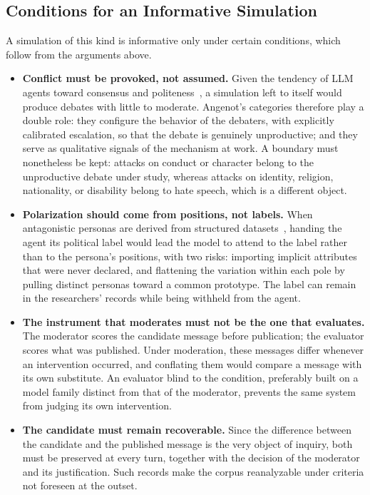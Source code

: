 \documentclass[conference]{IEEEtran}
\begin{document}
\subsection{Conditions for an Informative Simulation}\label{sec:conditions}

A simulation of this kind is informative only under certain conditions, which
follow from the arguments above.

\begin{itemize}
\item \textbf{Conflict must be provoked, not assumed.} Given the tendency of
LLM agents toward consensus and politeness~\cite{chuang2023simulating}, a
simulation left to itself would produce debates with little to moderate.
Angenot's categories therefore play a double role: they configure the
behavior of the debaters, with explicitly calibrated escalation, so that the
debate is genuinely unproductive; and they serve as qualitative signals of the
mechanism at work. A boundary must nonetheless be kept: attacks on conduct or
character belong to the unproductive debate under study, whereas attacks on
identity, religion, nationality, or disability belong to hate speech, which is
a different object.
\item \textbf{Polarization should come from positions, not labels.} When
antagonistic personas are derived from structured
datasets~\cite{li2026matraix}, handing the agent its political label would
lead the model to attend to the label rather than to the persona's positions,
with two risks: importing implicit attributes that were never declared, and
flattening the variation within each pole by pulling distinct personas toward
a common prototype. The label can remain in the researchers' records while
being withheld from the agent.
\item \textbf{The instrument that moderates must not be the one that
evaluates.} The moderator scores the candidate message before publication;
the evaluator scores what was published. Under moderation, these messages
differ whenever an intervention occurred, and conflating them would compare a
message with its own substitute. An evaluator blind to the condition,
preferably built on a model family distinct from that of the moderator,
prevents the same system from judging its own intervention.
\item \textbf{The candidate must remain recoverable.} Since the difference
between the candidate and the published message is the very object of
inquiry, both must be preserved at every turn, together with the decision of
the moderator and its justification. Such records make the corpus
reanalyzable under criteria not foreseen at the outset.
\end{itemize}
\end{document}
